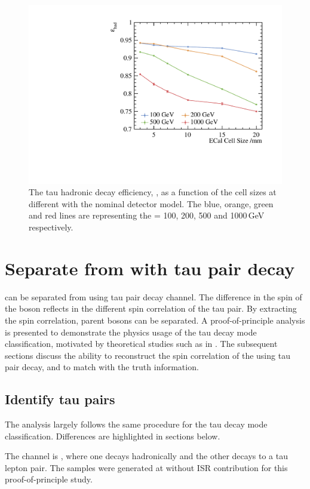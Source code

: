 \begin{figure}[htbp]
\centering %
\includegraphics[width=.45\textwidth]{tau/plots3/hadronicEff.pdf}
\caption[The tau hadronic decay efficiency as a function of  the \ECAL cell sizes at different \sqrtS with the nominal \ILD detector model.]
{The tau hadronic decay efficiency, \tauHad, as a function of  the \ECAL cell sizes at different \sqrtS with the nominal \ILD detector model. The blue, orange, green and red lines are representing the \sqrtS = 100, 200, 500 and 1000\,GeV respectively.}
\label{fig:TauHadronicEfficiency}
\end{figure}


\section{Separate \PHiggs from \PZ with tau pair decay}

\PHiggs can be separated from  \PZ using  tau pair decay channel.  The difference in the spin of the boson reflects in the different spin correlation of the tau pair. By extracting the spin correlation, parent bosons can be separated. A proof-of-principle analysis is presented to demonstrate the physics usage of the tau decay mode classification, motivated by theoretical studies such as in \cite{Bullock:1991my}. The subsequent sections discuss the ability to reconstruct the spin correlation of the \PZ using tau pair decay, and to match with the truth information.

\subsection{Identify tau pairs}

The analysis largely follows the same procedure for the tau decay mode classification. Differences are highlighted in sections below.

The channel is \HepProcess{\Pep \Pem \to \PZ \PZ}, where one \PZ decays hadronically and the other \PZ decays to a tau lepton pair. The samples were generated at  without ISR contribution for this proof-of-principle study.



